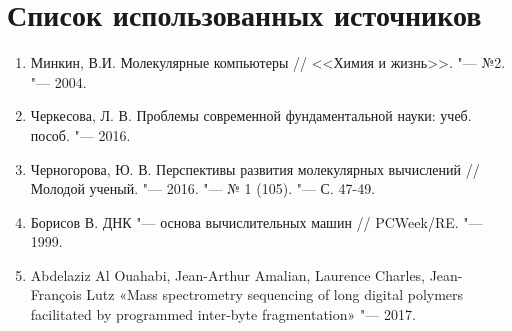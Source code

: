 \documentclass[titlepage, 12pt]{article}
\begin{document}
\newpage
\section*{Список использованных источников}


\begin{enumerate}
\item Минкин, В.И. Молекулярные компьютеры // <<Химия и жизнь>>. "--- №2. "--- 2004.
\item Черкесова, Л. В. Проблемы современной фундаментальной науки: учеб. пособ. "--- 2016.
\item Черногорова, Ю. В. Перспективы развития молекулярных вычислений // Молодой ученый. "--- 2016. "--- № 1 (105). "--- С. 47-49.
\item Борисов В. ДНК "--- основа вычислительных машин // PCWeek/RE. "--- 1999.
\item Abdelaziz Al Ouahabi, Jean-Arthur Amalian, Laurence Charles, Jean-François Lutz «Mass spectrometry sequencing of long digital polymers facilitated by programmed inter-byte fragmentation» "--- 2017.
\end{enumerate}
\end{document}
